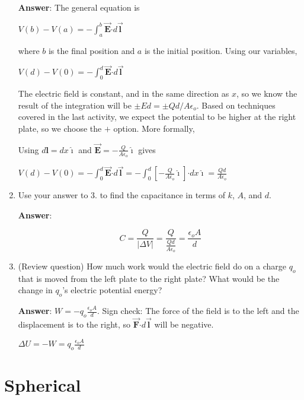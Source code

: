 \documentclass{article}
\newcommand{\ds}[0]{\displaystyle}
\newcommand{\ihat}[0]{\hat{\boldsymbol{\imath}}}
\newcommand{\bfvec}[1]{\vec{\mathbf{#1}}}
\newcommand{\bfcdot}[0]{\boldsymbol{\cdot}}
\begin{document}
\begin{enumerate}
     \ifsolutions
       {\bf Answer}: The general equation is

       $\ds V(b)-V(a) = -\int_a^b\bfvec{E}\bfcdot d\bfvec{l}$

       where $b$ is the final position and $a$ is the initial position. Using our variables,

       $\ds V(d)-V(0) = -\int_0^d\bfvec{E}\bfcdot d\bfvec{l}$

       The electric field is constant, and in the same direction as $x$, so we know the result of the integration will be $\pm Ed=\pm Qd/A\epsilon_o$. Based on techniques covered in the last activity, we expect the potential to be higher at the right plate, so we choose the $+$ option. More formally,

       Using $d\mathbf{l}=dx\ihat$  and $\bfvec{E}=-\frac{Q}{A\epsilon_o}\ihat$ gives

       $\ds V(d)-V(0) = -\int_0^d\bfvec{E}\bfcdot d\bfvec{l}=-\int_0^d\left[-\frac{Q}{A\epsilon_o}\ihat\right]\bfcdot dx\ihat=\frac{Qd}{A\epsilon_o}$
     \else
       \vskip 36pt
     \fi
     \ifsolutions\else
     \vskip 36pt
     \fi

  \item Use your answer to 3. to find the capacitance in terms of $k$, $A$, and $d$.

     \ifsolutions
       {\bf Answer}:

       \begin{equation}
     C = \frac{Q}{|\Delta V|} = \frac{Q}{\frac{Qd}{A\epsilon_o}}=\frac{\epsilon_oA}{d}
     \end{equation}
     \else
       \vskip 36pt
     \fi
     \ifsolutions\else
     \vskip 36pt
     \fi

  \item (Review question) How much work would the electric field do on a charge $q_o$ that is moved from the left plate to the right plate? What would be the change in $q_o$'s electric potential energy?

     \ifsolutions
       {\bf Answer}: $\ds W=-q_o\frac{\epsilon_oA}{d}$. Sign check: The force of the field is to the left and the displacement is to the right, so $\bfvec{F}\bfcdot d\bfvec{l}$ will be negative.

       $\ds\Delta U=-W=q_o\frac{\epsilon_oA}{d}$
     \else
       \vskip 36pt
     \fi
     \ifsolutions\else
     \vskip 36pt
     \fi

\end{enumerate}

\section{Spherical}
\end{document}
